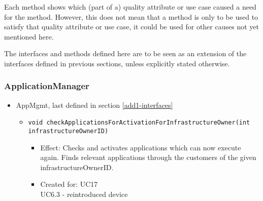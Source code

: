 {{{    Each method shows which (part of a) quality attribute or use case caused
    a need for the method. However, this does not mean that a method is
    only to be used to satisfy that quality  attribute or use case, it could
    be used for other causes not yet mentioned here.

    The interfaces and methods defined here are to be seen as an
    extension of the interfaces defined in previous sections, unless
    explicitly stated otherwise.

    \subsubsection{ApplicationManager}
        \begin{itemize}
            \item AppMgmt, last defined in section \ref{add1-interfaces}
                \begin{itemize}
                    \item \texttt{void checkApplicationsForActivationForInfrastructureOwner(int infrastructureOwnerID)}
                        \begin{itemize}
                			\item Effect: Checks and activates applications which can now execute again. Finds relevant applications through the customers of the given infrastructureOwnerID.
                			\item Created for: UC17 \\ UC6.3 - reintroduced device
                        \end{itemize}
                \end{itemize}


\end{itemize}}}}
